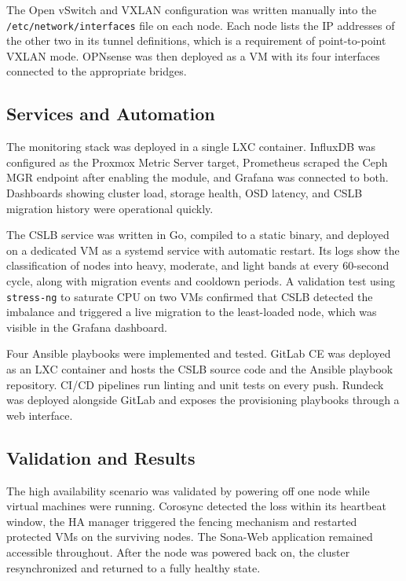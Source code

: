 \documentclass[12pt, a4paper]{article}
\begin{document}
The Open vSwitch and VXLAN configuration was written manually into the \texttt{/etc/network/interfaces} file on each node. Each node lists the IP addresses of the other two in its tunnel definitions, which is a requirement of point-to-point VXLAN mode. OPNsense was then deployed as a VM with its four interfaces connected to the appropriate bridges.

\subsection{Services and Automation}

The monitoring stack was deployed in a single LXC container. InfluxDB was configured as the Proxmox Metric Server target, Prometheus scraped the Ceph MGR endpoint after enabling the module, and Grafana was connected to both. Dashboards showing cluster load, storage health, OSD latency, and CSLB migration history were operational quickly.

The CSLB service was written in Go, compiled to a static binary, and deployed on a dedicated VM as a systemd service with automatic restart. Its logs show the classification of nodes into heavy, moderate, and light bands at every 60-second cycle, along with migration events and cooldown periods. A validation test using \texttt{stress-ng} to saturate CPU on two VMs confirmed that CSLB detected the imbalance and triggered a live migration to the least-loaded node, which was visible in the Grafana dashboard.

Four Ansible playbooks were implemented and tested. GitLab CE was deployed as an LXC container and hosts the CSLB source code and the Ansible playbook repository. CI/CD pipelines run linting and unit tests on every push. Rundeck was deployed alongside GitLab and exposes the provisioning playbooks through a web interface.

\subsection{Validation and Results}

The high availability scenario was validated by powering off one node while virtual machines were running. Corosync detected the loss within its heartbeat window, the HA manager triggered the fencing mechanism and restarted protected VMs on the surviving nodes. The Sona-Web application remained accessible throughout. After the node was powered back on, the cluster resynchronized and returned to a fully healthy state.
\end{document}
